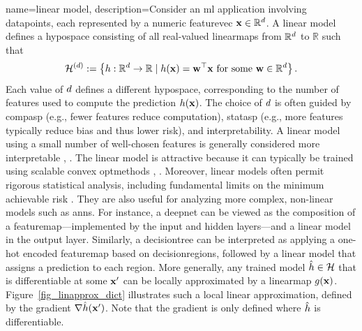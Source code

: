 {name={linear model}, 
	description={Consider an \gls{ml} application involving \glspl{datapoint}, each represented 
		by a numeric \gls{featurevec} ${\bf x} \in \mathbb{R}^{d}$. A linear \gls{model} defines 
		a \gls{hypospace} consisting of all real-valued \glspl{linearmap} from $\mathbb{R}^{d}$ to $\mathbb{R}$ such that
		\begin{equation}
			\label{equ_def_lin_model_hypspace_dict}
			\mathcal{H}^{(d)} := \left\{ h: \mathbb{R}^{d} \rightarrow \mathbb{R} \mid h({\bf x}) = {\bf w}^{\top} {\bf x} \text{ for some } {\bf w} \in \mathbb{R}^{d} \right\}.
		\end{equation}
		Each value of $d$ defines a different \gls{hypospace}, corresponding to the number of 
		\glspl{feature} used to compute the \gls{prediction} $h({\bf x})$. The choice of 
		$d$ is often guided by \gls{compasp} (e.g., fewer features reduce computation), \gls{statasp} 
		(e.g., more features typically reduce \gls{bias} and thus lower \gls{risk}), and \gls{interpretability}. 
		A linear \gls{model} using a small number of well-chosen \glspl{feature} is generally considered 
		more interpretable \cite{rudin2019stop}, \cite{Ribeiro2016}.
		The linear \gls{model} is attractive because it can typically be trained using scalable \gls{convex} \glspl{optmethod} \cite{hastie01statisticallearning}, \cite{BertsekasNonLinProgr}. 
		Moreover, linear \glspl{model} often permit rigorous 
		statistical analysis, including fundamental limits on the \gls{minimum} achievable \gls{risk} \cite{Wain2019}. 
		They are also useful for analyzing more complex, non-linear \glspl{model} such as \glspl{ann}. For instance, 
		a \gls{deepnet} can be viewed as the composition of a \gls{featuremap}—implemented by the input and 
		hidden layers—and a linear \gls{model} in the output layer. Similarly, a \gls{decisiontree} can be interpreted 
		as applying a one-hot encoded \gls{featuremap} based on \glspl{decisionregion}, followed by a linear 
		\gls{model} that assigns a \gls{prediction} to each region.
		More generally, any trained \gls{model} $\hat{h} \in \mathcal{H}$ that is 
		\gls{differentiable} at some ${\bf x}'$ can be locally approximated by a \gls{linearmap} 
		$g({\bf x})$. Figure~\ref{fig_linapprox_dict} illustrates such a local linear approximation, 
		defined by the \gls{gradient} $\nabla \hat{h}({\bf x}')$. Note that the \gls{gradient} 
		is only defined where $\hat{h}$ is \gls{differentiable}.
}}
